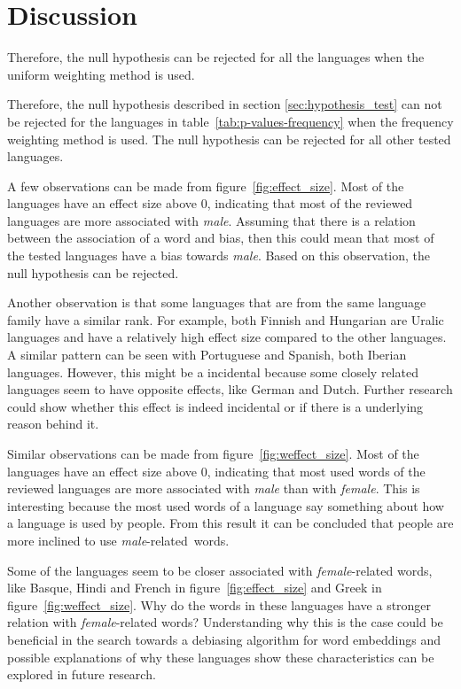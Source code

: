 \section{Discussion}
Therefore, the
null hypothesis can be rejected for all the languages when the uniform weighting method
is used.


Therefore, the null hypothesis described in section \ref{sec:hypothesis_test} can
not be rejected for the languages in table~\ref{tab:p-values-frequency} when the
frequency weighting method is used. The null hypothesis can be rejected for all
other tested languages.

A few observations can be made from figure~\ref{fig:effect_size}. Most
of the languages have an effect size above 0, indicating that most of the reviewed
languages are more associated with \emph{male}. Assuming that there is a relation between
the association of a word and bias, then this could mean that
most of the tested languages have a bias towards \emph{male}. Based on this observation,
the null hypothesis can be rejected.

Another observation is that some languages that are from the same language family have
a similar rank. For example, both Finnish and Hungarian are Uralic languages and have a
relatively high effect size compared to the other languages. A similar pattern can be seen
with Portuguese and Spanish, both Iberian languages. However, this might be a incidental
because some closely related languages seem to have opposite effects, like German and
Dutch. Further research could show whether this effect is indeed incidental or if
there is a underlying reason behind it.

Similar observations can be made from figure~\ref{fig:weffect_size}. Most
of the languages have an effect size above 0, indicating that most used words of the
reviewed languages are more associated with \emph{male} than with \emph{female}. This
is interesting because the most used words of a language say something about how a
language is used by people.
From this result it can be concluded that people are more inclined to use
\mbox{\emph{male}-related words}.

Some of the languages seem to be closer associated with \emph{female}-related words, like
Basque, Hindi and French in figure~\ref{fig:effect_size} and Greek in
figure~\ref{fig:weffect_size}. Why do the words in these languages have a stronger
relation with \emph{female}-related words?
Understanding why this is
the case could be beneficial in the search towards a debiasing algorithm for word
embeddings and possible explanations of why these languages show these characteristics can
be explored in future research.

